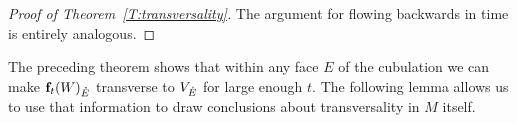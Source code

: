 \begin{proof}[Proof of Theorem~\ref{T:transversality}]
\begin{comment}
	By possibly making $\delta$ smaller we can choose $u \in (0, 1)$ by inductive hypothesis such that $\overline N_\delta(F) \setminus \overline N_\delta L_u(F)$ is contained in $\mathcal N^{i-1}$.

	By \cref{L:flow to initial and terminal faces} we may choose $t > T^{i-1}$ sufficiently large so that all points in $\f_t(W_E) \cap V_E \cap \overline N_\delta L_u(F)$ are of the form $y = \f_t(x)$ for some $x \in W_E \cap \overline N_\zeta(F^-)$.

	We use \cref{L:jacobian ratios} to deduce that the push forward of the span of $\beta_x$ along $D\,\f_t$ is as close as desired to the span of $\beta_F$ at $y$ and is therefore transverse to $T_y V_E$.
	The induction step is completed by taking $\mathcal N^i$ to be the union over all terminal faces of $N_\delta(F)$ and $T^i$ the maximum value of their associated $t$.

	\end{comment}

	The argument for flowing backwards in time is entirely analogous.


\end{proof}

The preceding theorem shows that within any face $E$ of the cubulation we can make $\mathbf{f}_t(W)_{\mathring{E}}$ transverse to $V_{\mathring{E}}$ for large enough $t$.
The following lemma allows us to use that information to draw conclusions about transversality in $M$ itself.


